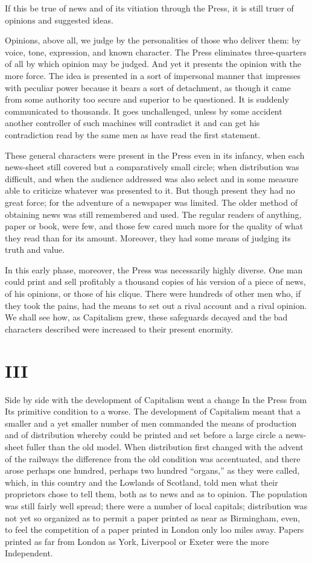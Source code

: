 \documentclass{book}
\begin{document}
If this be true of news and of its vitiation through the Press, it is still truer of opinions and suggested ideas.

Opinions, above all, we judge by the personalities of those who deliver them: by voice, tone, expression, and known character. The Press eliminates three-quarters of all by which opinion may be judged. And yet it presents the opinion with the more force. The idea is presented in a sort of impersonal manner that impresses with peculiar power because it bears a sort of detachment, as though it came from some authority too secure and superior to be questioned. It is suddenly communicated to thousands. It goes unchallenged, unless by some accident another controller of such machines will contradict it and can get his contradiction read by the same men as have read the first statement.

These general characters were present in the Press even in its infancy, when each news-sheet still covered but a comparatively small circle; when distribution was difficult, and when the audience addressed was also select and in some measure able to criticize whatever was presented to it. But though present they had no great force; for the adventure of a newspaper was limited. The older method of obtaining news was still remembered and used. The regular readers of anything, paper or book, were few, and those few cared much more for the quality of what they read than for its amount. Moreover, they had some means of judging its truth and value.

In this early phase, moreover, the Press was necessarily highly diverse. One man could print and sell profitably a thousand copies of his version of a piece of news, of his opinions, or those of his clique. There were hundreds of other men who, if they took the pains, had the means to set out a rival account and a rival opinion. We shall see how, as Capitalism grew, these safeguards decayed and the bad characters described were increased to their present enormity.

\chapter*{III}
\label{chapter-4}
Side by side with the development of Capitalism went a change In the Press from Its primitive condition to a worse. The development of Capitalism meant that a smaller and a yet smaller number of men commanded the means of production and of distribution whereby could be printed and set before a large circle a news-sheet fuller than the old model. When distribution first changed with the advent of the railways the difference from the old condition was accentuated, and there arose perhaps one hundred, perhaps two hundred “organs,” as they were called, which, in this country and the Lowlands of Scotland, told men what their proprietors chose to tell them, both as to news and as to opinion. The population was still fairly well spread; there were a number of local capitals; distribution was not yet so organized as to permit a paper printed as near as Birmingham, even, to feel the competition of a paper printed in London only loo miles away. Papers printed as far from London as York, Liverpool or Exeter were the more Independent.
\end{document}
